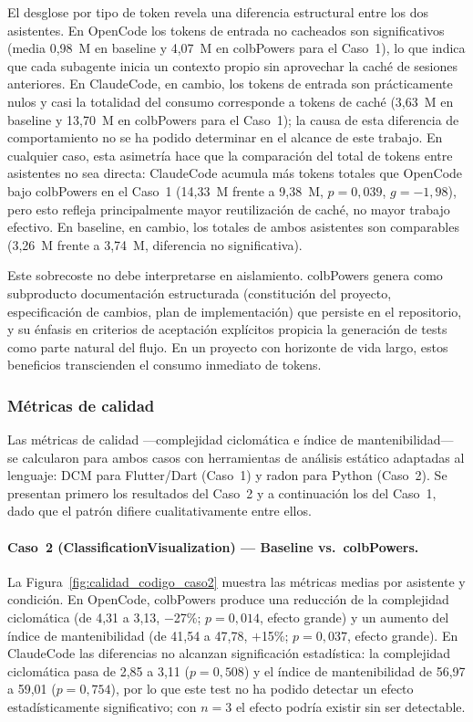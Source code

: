 \documentclass[11pt, letterpaper]{article}
\begin{document}
El desglose por tipo de token revela una diferencia estructural entre los dos asistentes. En OpenCode los tokens de entrada no cacheados son significativos (media 0,98~M en baseline y 4,07~M en colbPowers para el Caso~1), lo que indica que cada subagente inicia un contexto propio sin aprovechar la caché de sesiones anteriores. En ClaudeCode, en cambio, los tokens de entrada son prácticamente nulos y casi la totalidad del consumo corresponde a tokens de caché (3,63~M en baseline y 13,70~M en colbPowers para el Caso~1); la causa de esta diferencia de comportamiento no se ha podido determinar en el alcance de este trabajo. En cualquier caso, esta asimetría hace que la comparación del total de tokens entre asistentes no sea directa: ClaudeCode acumula más tokens totales que OpenCode bajo colbPowers en el Caso~1 (14,33~M frente a 9,38~M, $p=0{,}039$, $g=-1{,}98$), pero esto refleja principalmente mayor reutilización de caché, no mayor trabajo efectivo. En baseline, en cambio, los totales de ambos asistentes son comparables (3,26~M frente a 3,74~M, diferencia no significativa).

Este sobrecoste no debe interpretarse en aislamiento. colbPowers genera como subproducto documentación estructurada (constitución del proyecto, especificación de cambios, plan de implementación) que persiste en el repositorio, y su énfasis en criterios de aceptación explícitos propicia la generación de tests como parte natural del flujo. En un proyecto con horizonte de vida largo, estos beneficios transcienden el consumo inmediato de tokens.

\subsubsection{Métricas de calidad}

Las métricas de calidad ---complejidad ciclomática e índice de mantenibilidad--- se calcularon para ambos casos con herramientas de análisis estático adaptadas al lenguaje: DCM para Flutter/Dart (Caso~1) y radon para Python (Caso~2). Se presentan primero los resultados del Caso~2 y a continuación los del Caso~1, dado que el patrón difiere cualitativamente entre ellos.


\paragraph{Caso~2 (ClassificationVisualization) --- Baseline vs.\ colbPowers.}
La Figura~\ref{fig:calidad_codigo_caso2} muestra las métricas medias por asistente y condición. En OpenCode, colbPowers produce una reducción de la complejidad ciclomática (de 4,31 a 3,13, $-$27\%; $p=0{,}014$, efecto grande) y un aumento del índice de mantenibilidad (de 41,54 a 47,78, $+$15\%; $p=0{,}037$, efecto grande). En ClaudeCode las diferencias no alcanzan significación estadística: la complejidad ciclomática pasa de 2,85 a 3,11 ($p=0{,}508$) y el índice de mantenibilidad de 56,97 a 59,01 ($p=0{,}754$), por lo que este test no ha podido detectar un efecto estadísticamente significativo; con $n=3$ el efecto podría existir sin ser detectable.
\end{document}
